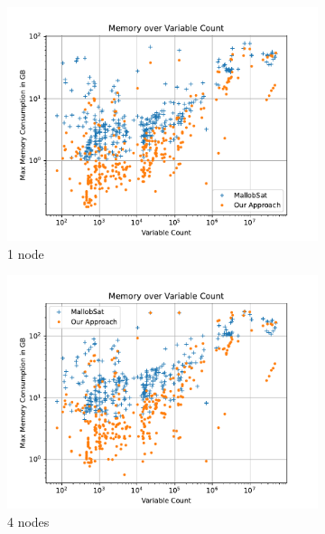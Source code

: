 \documentclass[12pt,a4paper,twoside]{scrartcl}
\numberwithin{equation}{section}
\begin{document}
\begin{figure}
  \center
  \begin{subfigure}[c]{.45\textwidth}
    \center
    \includegraphics[scale=.45]{plots/1node_compare/mem_abs_over_vars.pdf}
    \caption{1 node}
  \end{subfigure}
  \begin{subfigure}[c]{.45\textwidth}
    \center
    \includegraphics[scale=.45]{plots/4node_compare/mem_abs_over_vars.pdf}
    \caption{4 nodes}
  \end{subfigure}
  \begin{subfigure}[c]{.45\textwidth}
    \center

\end{subfigure}
\end{figure}
\end{document}
